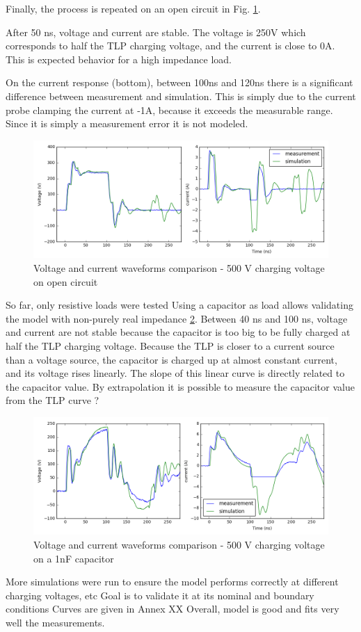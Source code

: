 Finally, the process is repeated on an open circuit in Fig. \ref{fig:comparison-tlp-open}.

After 50 ns, voltage and current are stable.
The voltage is 250V which corresponds to half the TLP charging voltage, and the current is close to 0A.
This is expected behavior for a high impedance load.

On the current response (bottom), between 100ns and 120ns there is a significant difference between measurement and simulation.
This is simply due to the current probe clamping the current at -1A, because it exceeds the measurable range.
Since it is simply a measurement error it is not modeled.

\begin{figure}[!h]
  \centering
  \includegraphics[width=\textwidth]{src/2/figures/tlp_comparison_open_500V.png}
  \caption{Voltage and current waveforms comparison - 500 V charging voltage on open circuit}
  \label{fig:comparison-tlp-open}
\end{figure}

So far, only resistive loads were tested
Using a capacitor as load allows validating the model with non-purely real impedance \ref{fig:comparison-tlp-capa}.
Between 40 ns and 100 ns, voltage and current are not stable because the capacitor is too big to be fully charged at half the TLP charging voltage.
Because the TLP is closer to a current source than a voltage source, the capacitor is charged up at almost constant current, and its voltage rises linearly.
The slope of this linear curve is directly related to the capacitor value.
By extrapolation it is possible to measure the capacitor value from the TLP curve ?

\begin{figure}[!h]
  \centering
  \includegraphics[width=\textwidth]{src/2/figures/tlp_comparison_1nF_500V.png}
  \caption{Voltage and current waveforms comparison - 500 V charging voltage on a 1nF capacitor}
  \label{fig:comparison-tlp-capa}
\end{figure}

More simulations were run to ensure the model performs correctly at different charging voltages, etc
Goal is to validate it at its nominal and boundary conditions
Curves are given in Annex XX
Overall, model is good and fits very well the measurements.
